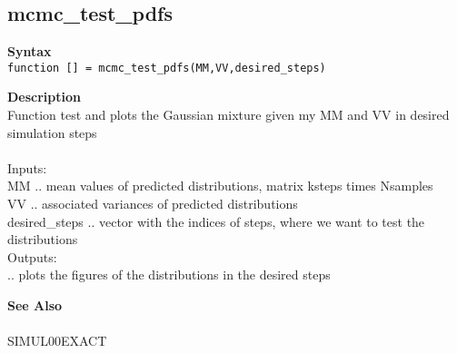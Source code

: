 \subsection*{mcmc\_test\_pdfs} \label{fun:mcmc_test_pdfs}


\textbf{Syntax}
\\ \texttt{function [] = mcmc\_test\_pdfs(MM,VV,desired\_steps)}

\textbf{Description}
\\ Function test and plots the Gaussian mixture given my MM and VV in
 desired simulation steps
 \\
\\ Inputs:
\\ MM .. mean values of predicted distributions, matrix ksteps times Nsamples
\\ VV .. associated variances of predicted distributions
\\ desired\_steps .. vector with the indices of steps, where we want to test
 the distributions
\\ Outputs:
\\ .. plots the figures of the distributions in the desired steps

\textbf{See Also}
\\
\\ SIMUL00EXACT
